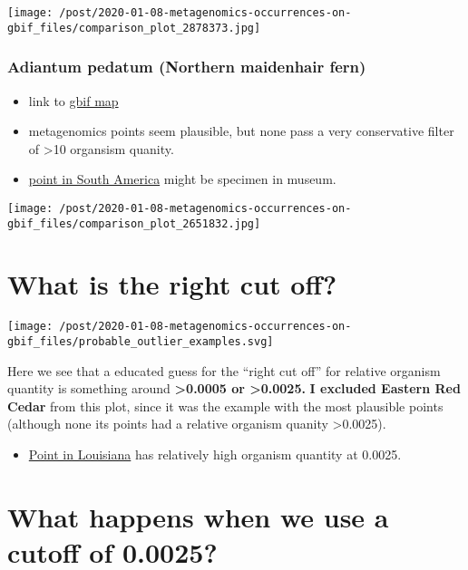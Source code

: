\documentclass[]{article}
\providecommand{\tightlist}{%
  \setlength{\itemsep}{0pt}\setlength{\parskip}{0pt}}
\begin{document}
\texttt{[image: /post/2020-01-08-metagenomics-occurrences-on-gbif\_files/comparison\_plot\_2878373.jpg]}

\hypertarget{adiantum-pedatum-northern-maidenhair-fern}{%
\subsubsection{Adiantum pedatum (Northern maidenhair
fern)}\label{adiantum-pedatum-northern-maidenhair-fern}}

\begin{itemize}
\tightlist
\item
  link to
  \href{https://www.gbif.org/occurrence/map?taxon_key=2651832}{gbif map}
\item
  {metagenomics points} seem plausible, but none pass a very
  conservative filter of \textgreater{}10 organsism quanity.
\item
  \href{https://www.gbif.org/occurrence/2273846947}{point in South
  America} might be specimen in museum.
\end{itemize}

\texttt{[image: /post/2020-01-08-metagenomics-occurrences-on-gbif\_files/comparison\_plot\_2651832.jpg]}

\hypertarget{what-is-the-right-cut-off}{%
\section{What is the right cut off?}\label{what-is-the-right-cut-off}}

\texttt{[image: /post/2020-01-08-metagenomics-occurrences-on-gbif\_files/probable\_outlier\_examples.svg]}

Here we see that a educated guess for the ``right cut off'' for relative
organism quantity is something around \textbf{\textgreater{}0.0005 or
\textgreater{}0.0025.} \textbf{I excluded Eastern Red Cedar} from this
plot, since it was the example with the most plausible points (although
none its points had a relative organism quanity \textgreater{}0.0025).

\begin{itemize}
\tightlist
\item
  \href{https://www.gbif.org/occurrence/2014001054}{Point in Louisiana}
  has relatively high organism quantity at 0.0025.
\end{itemize}

\hypertarget{what-happens-when-we-use-a-cutoff-of-0.0025}{%
\section{What happens when we use a cutoff of
0.0025?}\label{what-happens-when-we-use-a-cutoff-of-0.0025}}
\end{document}
